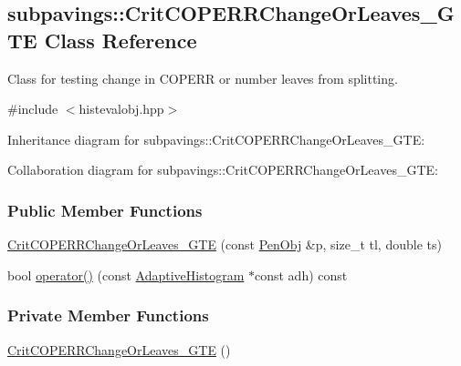 \hypertarget{classsubpavings_1_1CritCOPERRChangeOrLeaves__GTE}{\subsection{subpavings\-:\-:\-Crit\-C\-O\-P\-E\-R\-R\-Change\-Or\-Leaves\-\_\-\-G\-T\-E \-Class \-Reference}
\label{classsubpavings_1_1CritCOPERRChangeOrLeaves__GTE}
}


\-Class for testing change in \-C\-O\-P\-E\-R\-R or number leaves from splitting.  




{\ttfamily \#include $<$histevalobj.\-hpp$>$}



\-Inheritance diagram for subpavings\-:\-:\-Crit\-C\-O\-P\-E\-R\-R\-Change\-Or\-Leaves\-\_\-\-G\-T\-E\-:


\-Collaboration diagram for subpavings\-:\-:\-Crit\-C\-O\-P\-E\-R\-R\-Change\-Or\-Leaves\-\_\-\-G\-T\-E\-:
\subsubsection*{\-Public \-Member \-Functions}
\begin{DoxyCompactItemize}
\item 
\hyperlink{classsubpavings_1_1CritCOPERRChangeOrLeaves__GTE_aa9e17dd1cd8fabbabffb9541e75fdf29}{\-Crit\-C\-O\-P\-E\-R\-R\-Change\-Or\-Leaves\-\_\-\-G\-T\-E} (const \hyperlink{classsubpavings_1_1PenObj}{\-Pen\-Obj} \&p, size\-\_\-t tl, double ts)
\item 
bool \hyperlink{classsubpavings_1_1CritCOPERRChangeOrLeaves__GTE_a596ce8ff433ffac12d110c1ee0a6faab}{operator()} (const \hyperlink{classsubpavings_1_1AdaptiveHistogram}{\-Adaptive\-Histogram} $\ast$const adh) const 
\end{DoxyCompactItemize}
\subsubsection*{\-Private \-Member \-Functions}
\begin{DoxyCompactItemize}
\item 
\hyperlink{classsubpavings_1_1CritCOPERRChangeOrLeaves__GTE_ac5ed0dbd25e03235938265ac2a03f4b5}{\-Crit\-C\-O\-P\-E\-R\-R\-Change\-Or\-Leaves\-\_\-\-G\-T\-E} ()
\end{DoxyCompactItemize}
